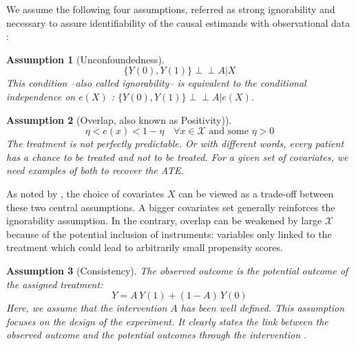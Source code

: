 \documentclass[unnumsec,webpdf,contemporary,large]{oup-authoring-template}%
\theoremstyle{thmstyleone}%
\theoremstyle{thmstyletwo}%
\theoremstyle{thmstylethree}%
\newtheorem{assumption}{Assumption}
\newcommand{\indep}{\perp \!\!\! \perp}
\begin{document}
\begin{appendices}
    We assume the following four assumptions, referred as strong ignorability and
    necessary to assure identifiability of the causal estimands with observational
    data \cite{rubin_causal_2005}:
    \begin{assumption}[Unconfoundedness]\label{assumption:ignorability}
        \begin{equation*}\label{eq:ignorability}
            \{Y(0), Y(1) \} \indep A | X
        \end{equation*}
        This condition --also called ignorability-- is equivalent to the conditional
        independence on $e(X)$ \cite{rosenbaum_central_1983}: $\{Y(0), Y(1) \}
            \indep  A | e(X)$.
    \end{assumption}


    \begin{assumption}[Overlap, also known as Positivity)]\label{assumption:overlap}
        \begin{equation*}\label{eq:overlap}
            \eta < e(x) < 1 - \eta \quad \forall x \in \mathcal X \text{ and some } \eta > 0
        \end{equation*}
        The treatment is not perfectly predictable. Or with different words, every
        patient has a chance to be treated and not to be treated. For a given set of
        covariates, we need examples of both to recover the ATE.
    \end{assumption}

    As noted by \cite{damour_overlap_2020}, the choice of covariates $X$ can
    be viewed as a trade-off between these two central assumptions. A bigger
    covariates set generally reinforces the ignorability assumption. In the
    contrary, overlap can be weakened by large $\mathcal{X}$ because of the
    potential inclusion of instruments: variables only linked to the treatment which
    could lead to arbitrarily small propensity scores.


    \begin{assumption}[Consistency]\label{assumption:consistency} The observed
        outcome is the potential outcome of the assigned treatment:
        \begin{equation*}\label{eq:consistancy}
            Y = A \, Y(1) + (1-A) \, Y(0)
        \end{equation*}
        Here, we assume that the intervention $A$ has been well defined. This
        assumption focuses on the design of the experiment. It clearly states the link
        between the observed outcome and the potential outcomes through the
        intervention \cite{hernan_causal_2020}.
    \end{assumption}


\end{appendices}
\end{document}
